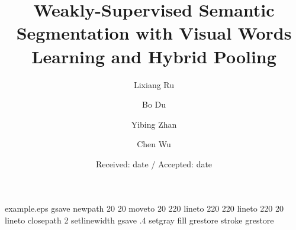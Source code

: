\begin{filecontents*}{example.eps}
gsave
  newpath
    20 20 moveto
    20 220 lineto
    220 220 lineto
    220 20 lineto
  closepath
  2 setlinewidth
  gsave
    .4 setgray fill
  grestore
  stroke
  grestore
  \end{filecontents*}
\RequirePackage{fix-cm}
\documentclass[twocolumn]{svjour3}          \smartqed  

  \usepackage{soul}
  \usepackage{url}
  \usepackage[utf8]{inputenc}
  \usepackage[small]{caption}
  \usepackage{booktabs}
\usepackage{natbib}
  
\usepackage[colorlinks=true]{hyperref}
  \usepackage{amsmath}
  \usepackage{amssymb}
  \usepackage{xspace}
  \usepackage{tablefootnote}
  \usepackage{graphicx}
  \usepackage[ruled,vlined]{algorithm2e}
  \usepackage[table,xcdraw]{xcolor}
  \usepackage{multirow}
  \usepackage{subcaption}
  \usepackage{float}
  \usepackage[misc]{ifsym}
  \graphicspath{{./figures/}}


\title{Weakly-Supervised Semantic Segmentation with Visual Words Learning and Hybrid Pooling}


\author{Lixiang Ru  \and Bo Du  \and Yibing Zhan  \and Chen Wu }


\date{Received: date / Accepted: date}



\maketitle


\makeatletter
\DeclareRobustCommand\onedot{\futurelet\@let@token\@onedot}
\def\@onedot{\ifx\@let@token.\else.\null\fi\xspace}

\def\eg{\emph{e.g}\onedot} \def\Eg{\emph{E.g}\onedot}
\def\ie{\emph{i.e}\onedot} \def\Ie{\emph{I.e}\onedot}
\def\cf{\emph{c.f}\onedot} \def\Cf{\emph{C.f}\onedot}
\def\etc{\emph{etc}\onedot} \def\vs{\emph{vs}\onedot}
\def\wrt{w.r.t\onedot} \def\dof{d.o.f\onedot}
\def\etal{\emph{et al}\onedot}
\makeatother


